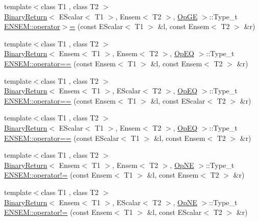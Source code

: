 \begin{DoxyCompactItemize}
\item 
{\footnotesize template$<$class T1 , class T2 $>$ }\\\mbox{\hyperlink{structBinaryReturn}{Binary\+Return}}$<$ E\+Scalar$<$ T1 $>$, Ensem$<$ T2 $>$, \mbox{\hyperlink{structOpGE}{Op\+GE}} $>$\+::Type\+\_\+t \mbox{\hyperlink{group__eensem_ga08b4c51fd25a40dd1d20e6138378a63d}{E\+N\+S\+E\+M\+::operator$>$=}} (const E\+Scalar$<$ T1 $>$ \&l, const Ensem$<$ T2 $>$ \&r)
\item 
{\footnotesize template$<$class T1 , class T2 $>$ }\\\mbox{\hyperlink{structBinaryReturn}{Binary\+Return}}$<$ Ensem$<$ T1 $>$, Ensem$<$ T2 $>$, \mbox{\hyperlink{structOpEQ}{Op\+EQ}} $>$\+::Type\+\_\+t \mbox{\hyperlink{group__eensem_ga8f2413d9b23131f67cbe4d3bd222e0ec}{E\+N\+S\+E\+M\+::operator==}} (const Ensem$<$ T1 $>$ \&l, const Ensem$<$ T2 $>$ \&r)
\item 
{\footnotesize template$<$class T1 , class T2 $>$ }\\\mbox{\hyperlink{structBinaryReturn}{Binary\+Return}}$<$ Ensem$<$ T1 $>$, E\+Scalar$<$ T2 $>$, \mbox{\hyperlink{structOpEQ}{Op\+EQ}} $>$\+::Type\+\_\+t \mbox{\hyperlink{group__eensem_ga4b52007b3c1511c746a46b46e5b145b1}{E\+N\+S\+E\+M\+::operator==}} (const Ensem$<$ T1 $>$ \&l, const E\+Scalar$<$ T2 $>$ \&r)
\item 
{\footnotesize template$<$class T1 , class T2 $>$ }\\\mbox{\hyperlink{structBinaryReturn}{Binary\+Return}}$<$ E\+Scalar$<$ T1 $>$, Ensem$<$ T2 $>$, \mbox{\hyperlink{structOpEQ}{Op\+EQ}} $>$\+::Type\+\_\+t \mbox{\hyperlink{group__eensem_gade522cbdb1f590216dd1c5e3dd034e79}{E\+N\+S\+E\+M\+::operator==}} (const E\+Scalar$<$ T1 $>$ \&l, const Ensem$<$ T2 $>$ \&r)
\item 
{\footnotesize template$<$class T1 , class T2 $>$ }\\\mbox{\hyperlink{structBinaryReturn}{Binary\+Return}}$<$ Ensem$<$ T1 $>$, Ensem$<$ T2 $>$, \mbox{\hyperlink{structOpNE}{Op\+NE}} $>$\+::Type\+\_\+t \mbox{\hyperlink{group__eensem_ga9f462a3d207e1a214ab95765f6fb90d3}{E\+N\+S\+E\+M\+::operator!=}} (const Ensem$<$ T1 $>$ \&l, const Ensem$<$ T2 $>$ \&r)
\item 
{\footnotesize template$<$class T1 , class T2 $>$ }\\\mbox{\hyperlink{structBinaryReturn}{Binary\+Return}}$<$ Ensem$<$ T1 $>$, E\+Scalar$<$ T2 $>$, \mbox{\hyperlink{structOpNE}{Op\+NE}} $>$\+::Type\+\_\+t \mbox{\hyperlink{group__eensem_ga8086f697f52b0363688785b35a8cdca3}{E\+N\+S\+E\+M\+::operator!=}} (const Ensem$<$ T1 $>$ \&l, const E\+Scalar$<$ T2 $>$ \&r)

\end{DoxyCompactItemize}
